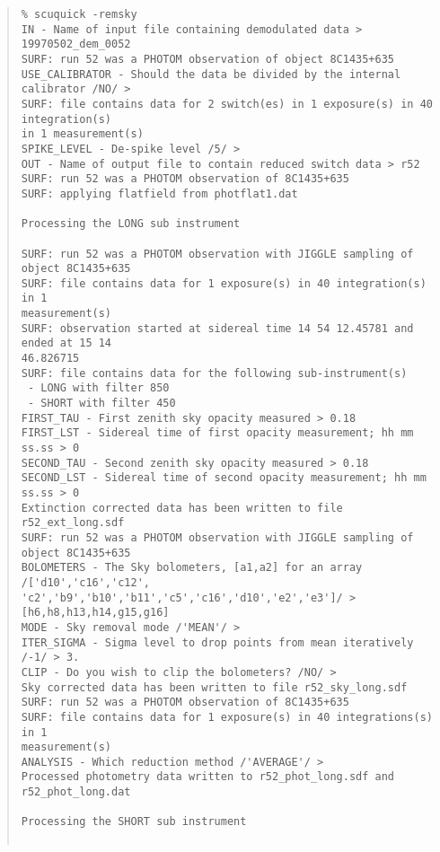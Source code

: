\documentclass[twoside,11pt,fleqn]{article}
\newenvironment{myquote}{\begin{quote}\begin{small}}{\end{small}\end{quote}}
\begin{document}
\begin{myquote}
\begin{verbatim}
% scuquick -remsky
IN - Name of input file containing demodulated data > 19970502_dem_0052
SURF: run 52 was a PHOTOM observation of object 8C1435+635
USE_CALIBRATOR - Should the data be divided by the internal calibrator /NO/ >
SURF: file contains data for 2 switch(es) in 1 exposure(s) in 40 integration(s)
in 1 measurement(s)
SPIKE_LEVEL - De-spike level /5/ >
OUT - Name of output file to contain reduced switch data > r52
SURF: run 52 was a PHOTOM observation of 8C1435+635
SURF: applying flatfield from photflat1.dat

Processing the LONG sub instrument

SURF: run 52 was a PHOTOM observation with JIGGLE sampling of object 8C1435+635
SURF: file contains data for 1 exposure(s) in 40 integration(s) in 1
measurement(s)
SURF: observation started at sidereal time 14 54 12.45781 and ended at 15 14
46.826715
SURF: file contains data for the following sub-instrument(s)
 - LONG with filter 850
 - SHORT with filter 450
FIRST_TAU - First zenith sky opacity measured > 0.18
FIRST_LST - Sidereal time of first opacity measurement; hh mm ss.ss > 0
SECOND_TAU - Second zenith sky opacity measured > 0.18
SECOND_LST - Sidereal time of second opacity measurement; hh mm ss.ss > 0
Extinction corrected data has been written to file r52_ext_long.sdf
SURF: run 52 was a PHOTOM observation with JIGGLE sampling of object 8C1435+635
BOLOMETERS - The Sky bolometers, [a1,a2] for an array /['d10','c16','c12',
'c2','b9','b10','b11','c5','c16','d10','e2','e3']/ > [h6,h8,h13,h14,g15,g16]
MODE - Sky removal mode /'MEAN'/ >
ITER_SIGMA - Sigma level to drop points from mean iteratively /-1/ > 3.
CLIP - Do you wish to clip the bolometers? /NO/ >
Sky corrected data has been written to file r52_sky_long.sdf
SURF: run 52 was a PHOTOM observation of 8C1435+635
SURF: file contains data for 1 exposure(s) in 40 integrations(s) in 1
measurement(s)
ANALYSIS - Which reduction method /'AVERAGE'/ >
Processed photometry data written to r52_phot_long.sdf and r52_phot_long.dat

Processing the SHORT sub instrument


\end{verbatim}
\end{myquote}
\end{document}
